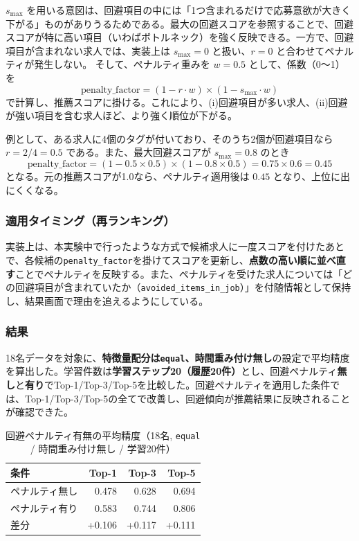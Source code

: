 $s_{\max}$ を用いる意図は、回避項目の中には「1つ含まれるだけで応募意欲が大きく下がる」ものがありうるためである。最大の回避スコアを参照することで、回避スコアが特に高い項目（いわばボトルネック）を強く反映できる。一方で、回避項目が含まれない求人では、実装上は $s_{\max}=0$ と扱い、$r=0$ と合わせてペナルティが発生しない。
そして、ペナルティ重みを $w=0.5$ として、係数（0〜1）を
\[
\text{penalty\_factor} = (1 - r \cdot w)\times(1 - s_{\max}\cdot w)
\]
で計算し、推薦スコアに掛ける。これにより、(i)回避項目が多い求人、(ii)回避が強い項目を含む求人ほど、より強く順位が下がる。

例として、ある求人に4個のタグが付いており、そのうち2個が回避項目なら $r=2/4=0.5$ である。また、最大回避スコアが $s_{\max}=0.8$ のとき
\[
\text{penalty\_factor} = (1-0.5\times0.5)\times(1-0.8\times0.5)=0.75\times0.6=0.45
\]
となる。元の推薦スコアが1.0なら、ペナルティ適用後は $0.45$ となり、上位に出にくくなる。

\subsubsection*{適用タイミング（再ランキング）}
実装上は、本実験中で行ったような方式で候補求人に一度スコアを付けたあとで、各候補の\texttt{penalty\_factor}を掛けてスコアを更新し、\textbf{点数の高い順に並べ直す}ことでペナルティを反映する。また、ペナルティを受けた求人については「どの回避項目が含まれていたか（\texttt{avoided\_items\_in\_job}）」を付随情報として保持し、結果画面で理由を追えるようにしている。


\subsubsection*{結果}
18名データを対象に、\textbf{特徴量配分は\texttt{equal}、時間重み付け無し}の設定で平均精度を算出した。学習件数は\textbf{学習ステップ20（履歴20件）}とし、回避ペナルティ\textbf{無し}と\textbf{有り}でTop-1/Top-3/Top-5を比較した。回避ペナルティを適用した条件では、Top-1/Top-3/Top-5の全てで改善し、回避傾向が推薦結果に反映されることが確認できた。

\begin{table}[htbp]
\centering
\caption{回避ペナルティ有無の平均精度（18名, \texttt{equal} / 時間重み付け無し / 学習20件）}
\begin{tabular}{l r r r}
\hline
条件 & Top-1 & Top-3 & Top-5 \\
\hline
ペナルティ無し & 0.478 & 0.628 & 0.694 \\
ペナルティ有り & 0.583 & 0.744 & 0.806 \\
差分 & +0.106 & +0.117 & +0.111 \\
\hline
\end{tabular}
\end{table}

